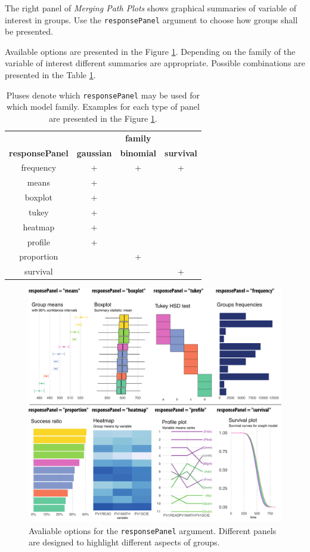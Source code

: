 \documentclass[12pt]{article}
\begin{document}
The right panel of \emph{Merging Path Plots} shows graphical summaries of variable of interest in groups. Use the \texttt{responsePanel} argument to choose how groups shall be presented.

Available options are presented in the Figure \ref{fig:panele}. Depending on the family of the variable of interest different summaries are appropriate. Possible combinations are presented in 
the Table \ref{tab:responsePanelT}.

\begin{table}[H]
\centering 
\begin{tabular}[t]{c|c|c|c}
 \textbf{} & \textbf{} & \textbf{family} & \textbf{} \\
 \textbf{responsePanel} & \textbf{gaussian} & \textbf{binomial} & \textbf{survival} \\
\hline frequency & + & + & + \\
\hline means & + & &  \\
\hline boxplot & + & &  \\
\hline tukey & + & &  \\
\hline heatmap & + & &  \\
\hline profile & + & &  \\
\hline proportion & & + &  \\
\hline survival & & & + \\
\hline 
\end{tabular}
\caption{\label{tab:responsePanelT}Pluses denote which \texttt{responsePanel} may be used for which model family. Examples for each type of panel are presented in the Figure \ref{fig:panele}.}
\end{table}



\begin{figure}[h!tbp]
\centering
\includegraphics[width=\textwidth]{panelsWide}
\caption{\label{fig:panele}Avaliable options for the \texttt{responsePanel} argument. Different panels are designed to highlight different aspects of groups.}
\end{figure}
\end{document}
